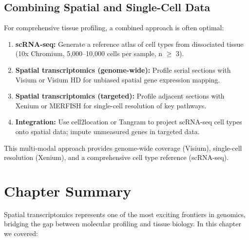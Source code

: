 \subsection{Combining Spatial and Single-Cell Data}

\begin{protocolbox}[title={Recommended Multi-Modal Experimental Design}]
For comprehensive tissue profiling, a combined approach is often optimal:
\begin{enumerate}[nosep]
  \item \textbf{scRNA-seq:} Generate a reference atlas of cell types from
    dissociated tissue (10x Chromium, 5,000--10,000 cells per sample, n $\geq$ 3).
  \item \textbf{Spatial transcriptomics (genome-wide):} Profile serial sections
    with Visium or Visium HD for unbiased spatial gene expression mapping.
  \item \textbf{Spatial transcriptomics (targeted):} Profile adjacent sections
    with Xenium or MERFISH for single-cell resolution of key pathways.
  \item \textbf{Integration:} Use cell2location or Tangram to project scRNA-seq
    cell types onto spatial data; impute unmeasured genes in targeted data.
\end{enumerate}
This multi-modal approach provides genome-wide coverage (Visium), single-cell
resolution (Xenium), and a comprehensive cell type reference (scRNA-seq).
\end{protocolbox}


\section{Chapter Summary}
\label{sec:spatial:summary}

Spatial transcriptomics represents one of the most exciting frontiers in
genomics, bridging the gap between molecular profiling and tissue biology. In
this chapter we covered:

